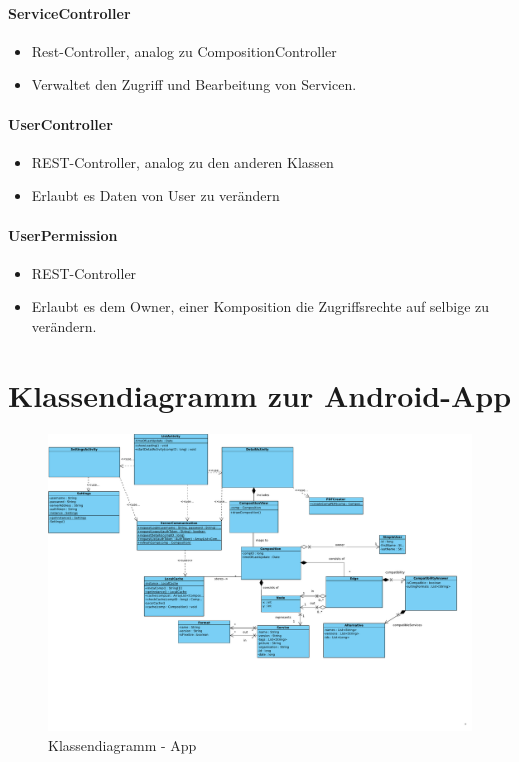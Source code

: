 \paragraph{ServiceController}
\begin{itemize}
	\item Rest-Controller, analog zu CompositionController
	\item Verwaltet den Zugriff und Bearbeitung von Servicen.
\end{itemize}
\paragraph{UserController}
\begin{itemize}
	\item REST-Controller, analog zu den anderen Klassen
	\item Erlaubt es Daten von User zu verändern
\end{itemize}
\paragraph{UserPermission}
\begin{itemize}
	\item REST-Controller
	\item Erlaubt es dem Owner, einer Komposition die Zugriffsrechte auf selbige zu verändern.
\end{itemize}

\newpage
\section*{Klassendiagramm zur Android-App}

\begin{figure}[!h]
	\centering
	\includegraphics[width=\textwidth]{img/Diagramme/Klassen/App}
	\caption{Klassendiagramm - App}
	\label{fig:klassendiagramm-app}
\end{figure}

